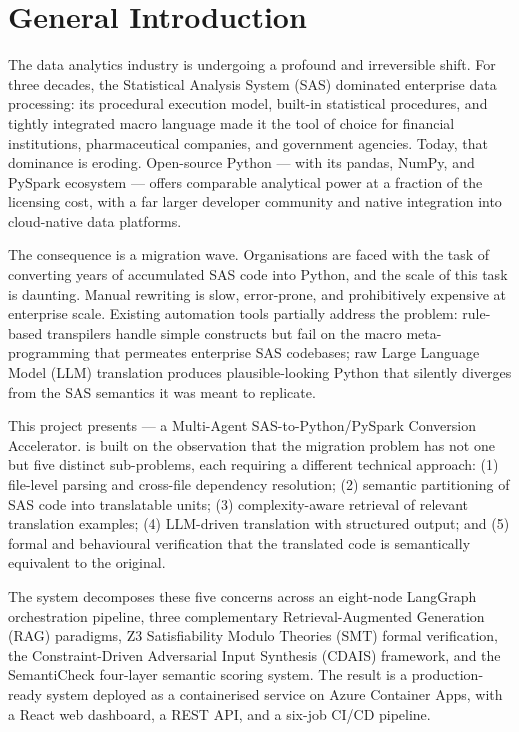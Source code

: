 
\chapter*{General Introduction}
\thispagestyle{fancy}

The data analytics industry is undergoing a profound and irreversible shift.
For three decades, the Statistical Analysis System (SAS) dominated enterprise
data processing: its procedural execution model, built-in statistical procedures,
and tightly integrated macro language made it the tool of choice for financial
institutions, pharmaceutical companies, and government agencies. Today, that
dominance is eroding. Open-source Python --- with its pandas, NumPy, and PySpark
ecosystem --- offers comparable analytical power at a fraction of the licensing
cost, with a far larger developer community and native integration into
cloud-native data platforms.

The consequence is a migration wave. Organisations are faced with the task of
converting years of accumulated SAS code into Python, and the scale of this
task is daunting. Manual rewriting is slow, error-prone, and prohibitively
expensive at enterprise scale. Existing automation tools partially address the
problem: rule-based transpilers handle simple constructs but fail on the macro
meta-programming that permeates enterprise SAS codebases; raw Large Language
Model (LLM) translation produces plausible-looking Python that silently diverges
from the SAS semantics it was meant to replicate.

This project presents \codara{} --- a Multi-Agent SAS-to-Python/PySpark
Conversion Accelerator. \codara{} is built on the observation that the
migration problem has not one but five distinct sub-problems, each requiring a
different technical approach: (1) file-level parsing and cross-file dependency
resolution; (2) semantic partitioning of SAS code into translatable units;
(3) complexity-aware retrieval of relevant translation examples; (4) LLM-driven
translation with structured output; and (5) formal and behavioural verification
that the translated code is semantically equivalent to the original.

The system decomposes these five concerns across an eight-node LangGraph
orchestration pipeline, three complementary Retrieval-Augmented Generation
(RAG) paradigms, Z3 Satisfiability Modulo Theories (SMT) formal verification,
the Constraint-Driven Adversarial Input Synthesis (CDAIS) framework, and the
SemantiCheck four-layer semantic scoring system. The result is a
production-ready system deployed as a containerised service on Azure Container
Apps, with a React web dashboard, a REST API, and a six-job CI/CD pipeline.

